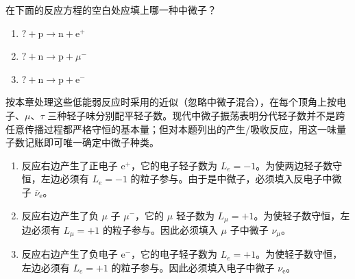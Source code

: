 \begin{exercise}\label{ex:30.2}
在下面的反应方程的空白处应填上哪一种中微子？
\begin{enumerate}
  \item[(a)] $? + \mathrm{p} \rightarrow \mathrm{n} + \mathrm{e}^+$
  \item[(b)] $? + \mathrm{n} \rightarrow \mathrm{p} + \mu^-$
  \item[(c)] $? + \mathrm{n} \rightarrow \mathrm{p} + \mathrm{e}^-$
\end{enumerate}
\end{exercise}
\begin{solution}
按本章处理这些低能弱反应时采用的近似（忽略中微子混合），在每个顶角上按电子、$\mu$、$\tau$ 三种轻子味分别配平轻子数。现代中微子振荡表明分代轻子数并不是跨任意传播过程都严格守恒的基本量；但对本题列出的产生/吸收反应，用这一味量子数记账即可唯一确定中微子种类。

\begin{enumerate}
    \item[(a)] 反应右边产生了正电子 $\mathrm{e}^+$，它的电子轻子数为 $L_e = -1$。为使两边轻子数守恒，左边必须有 $L_e = -1$ 的粒子参与。由于是中微子，必须填入反电子中微子 $\bar{\nu}_{\mathrm{e}}$。
    \item[(b)] 反应右边产生了负 $\mu$ 子 $\mu^-$，它的 $\mu$ 轻子数为 $L_\mu = +1$。为使轻子数守恒，左边必须有 $L_\mu = +1$ 的粒子参与。因此必须填入 $\mu$ 子中微子 $\nu_\mu$。
    \item[(c)] 反应右边产生了负电子 $\mathrm{e}^-$，它的电子轻子数为 $L_e = +1$。为使轻子数守恒，左边必须有 $L_e = +1$ 的粒子参与。因此必须填入电子中微子 $\nu_{\mathrm{e}}$。
\end{enumerate}
\end{solution}

